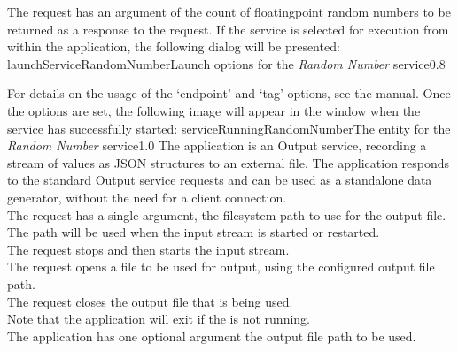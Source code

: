 The  request has an argument of the
count of floating\longDash{}point random numbers to be returned as a response to the
request.
%
\condPage
If the service is selected for execution from within the \emph{\MMMU} application, the
following dialog will be presented:
%
{launchServiceRandomNumber}{Launch options for the \emph{Random Number} service}{0.8}

For details on the usage of the `endpoint' and `tag' options, see the \emph{\MMMU} manual.
Once the options are set, the following image will appear in the \emph{\MMMU} window when
the service has successfully started:
%
{serviceRunningRandomNumber}{The \emph{\MMMU} entity for the \emph{Random Number}
service}{1.0}
\condPage
{}
The  application is an Output
service, recording a stream of \yarp{} values as JSON structures to an external file.
The application responds to the standard Output service requests and can be used as a
standalone data generator, without the need for a client connection.\\

The  request has a single argument,
the file\longDash{}system path to use for the output file.
The path will be used when the input stream is started or restarted.\\

The  request stops and then
starts the input stream.\\

The  request opens a file to be
used for output, using the configured output file path.\\

The  request closes the output
file that is being used.\\

Note that the application will exit if the  is not
running.\\

The application has one optional argument \longDash{} the output file path to be used.
\insertAppParameters
{}
\insertOutputServiceComment\\

